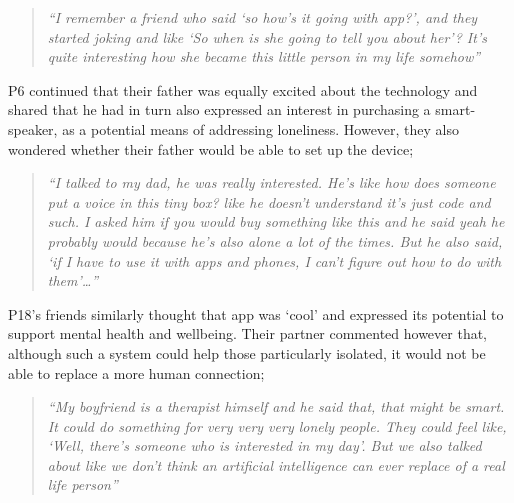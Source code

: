                 \begin{quote}
                \vspace{2mm}
                    \textit{``I remember a friend who said `so how's it going with \acl{app}?', and they started joking and like `So when is she going to tell you about her'? It's quite interesting how she became this little person in my life somehow''} %
                \vspace{2mm}
                \end{quote} 
            
            P6 continued that their father was equally excited about the technology and shared that he had in turn also expressed an interest in purchasing a smart-speaker, as a potential means of addressing loneliness. However, they also wondered whether their father would be able to set up the device;
            
                \begin{quote}
                \vspace{2mm}
                    \textit{``I talked to my dad, he was really interested. 
                    He's like how does someone put a voice in this tiny box? like he doesn't understand it's just code and such. I asked him if you would buy something like this and he said yeah he probably would because he's also alone a lot of the times. But he also said, `if I have to use it with apps and phones, I can't figure out how to do with them'\ldots ''} %
                \vspace{2mm}
                \end{quote} 
            
            P18's friends similarly thought that \acl{app} was `cool' and expressed its potential to support mental health and wellbeing. Their partner commented however that, although such a system could help those particularly isolated, it would not be able to replace a more human connection;
            
                \begin{quote}
                \vspace{2mm}
                    \textit{``My boyfriend is a therapist himself and he said that, that might be smart. It could do something for very very very lonely people. They could feel like, `Well, there's someone who is interested in my day'. But we also talked about like we don't think an artificial intelligence can ever replace of a real life person''} %
                \vspace{2mm}
                \end{quote} 
            
